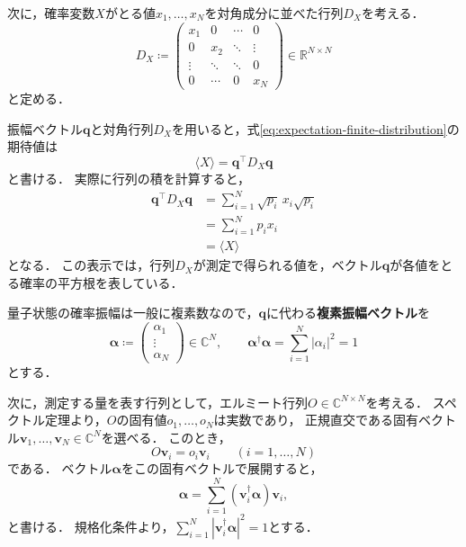 次に，確率変数$X$がとる値$x_1,\ldots,x_N$を対角成分に並べた行列$D_X$を考える．
\begin{equation}
  D_X\coloneq
  \begin{pmatrix}
    x_1    & 0      & \cdots & 0      \\
    0      & x_2    & \ddots & \vdots \\
    \vdots & \ddots & \ddots & 0      \\
    0      & \cdots & 0      & x_N
  \end{pmatrix}
  \in\mathbb R^{N\times N}
  \label{eq:classical-observable-diagonal-matrix}
\end{equation}
と定める．

振幅ベクトル$\bm{q}$と対角行列$D_X$を用いると，式\eqref{eq:expectation-finite-distribution}の期待値は
\begin{equation}
  \langle X\rangle=\bm{q}^\top D_X \bm{q}
  \label{eq:classical-expectation-matrix-form}
\end{equation}
と書ける．
実際に行列の積を計算すると，
\begin{equation*}
  \begin{aligned}
    \bm{q}^\top D_X \bm{q}
     & =\sum_{i=1}^{N}\sqrt{p_i}\,x_i\sqrt{p_i} \\
     & =\sum_{i=1}^{N}p_i x_i                   \\
     & =\langle X\rangle
  \end{aligned}
\end{equation*}
となる．
この表示では，行列$D_X$が測定で得られる値を，ベクトル$\bm{q}$が各値をとる確率の平方根を表している．

量子状態の確率振幅は一般に複素数なので，$\bm{q}$に代わる\textbf{複素振幅ベクトル}を
\begin{equation}
  \bm{\alpha}\coloneq
  \begin{pmatrix}\alpha_1\\\vdots\\\alpha_N\end{pmatrix}
  \in\mathbb C^N,
  \qquad
  \bm{\alpha}^{\dagger}\bm{\alpha}
  =\sum_{i=1}^{N}|\alpha_i|^2=1
  \label{eq:complex-amplitude-vector}
\end{equation}
とする．

次に，測定する量を表す行列として，エルミート行列$O\in\mathbb C^{N\times N}$を考える．
スペクトル定理より，$O$の固有値$o_1,\ldots,o_N$は実数であり，
正規直交である固有ベクトル$\bm{v}_1,\ldots,\bm{v}_N \in \mathbb C^N$を選べる．
このとき，
\begin{equation*}
  O\bm{v}_i=o_i\bm{v}_i
  \qquad(i=1,\ldots,N)
\end{equation*}
である．
ベクトル$\bm{\alpha}$をこの固有ベクトルで展開すると，
\begin{equation}
  \bm{\alpha}=\sum_{i=1}^{N} (\bm{v}_i^{\dagger}\bm{\alpha}) \bm{v}_i,
  \label{eq:state-in-observable-eigenbasis}
\end{equation}
と書ける．
規格化条件より，$\sum_{i=1}^{N}|\bm{v}_i^{\dagger}\bm{\alpha}|^2=1$とする．

